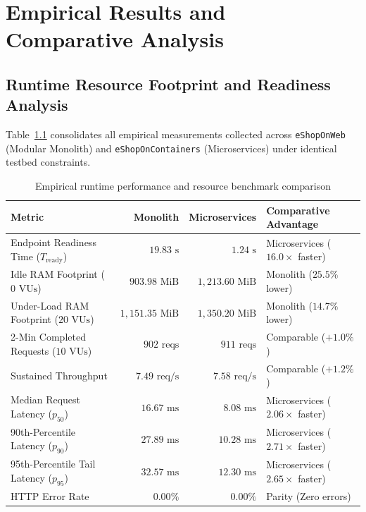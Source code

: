 \chapter{Empirical Results and Comparative Analysis}
\label{chap:results}

\section{Runtime Resource Footprint and Readiness Analysis}
\label{sec:resource-results}

Table~\ref{tab:runtime-metrics} consolidates all empirical measurements collected across \texttt{eShopOnWeb} (Modular Monolith) and \texttt{eShopOnContainers} (Microservices) under identical testbed constraints.

\begin{table}[h]
  \caption{Empirical runtime performance and resource benchmark comparison}
  \label{tab:runtime-metrics}
  \centering
  \begin{tabular}{p{5.0cm}rrp{3.6cm}}
    \toprule
    \textbf{Metric} & \textbf{Monolith} & \textbf{Microservices} & \textbf{Comparative Advantage} \\
    \midrule
    Endpoint Readiness Time ($T_{\text{ready}}$) & $19.83\text{ s}$ & $1.24\text{ s}$ & Microservices ($16.0\times$ faster) \\
    Idle RAM Footprint ($0\text{ VUs}$) & $903.98\text{ MiB}$ & $1,213.60\text{ MiB}$ & Monolith ($25.5\%$ lower) \\
    Under-Load RAM Footprint ($20\text{ VUs}$) & $1,151.35\text{ MiB}$ & $1,350.20\text{ MiB}$ & Monolith ($14.7\%$ lower) \\
    2-Min Completed Requests ($10\text{ VUs}$) & $902\text{ reqs}$ & $911\text{ reqs}$ & Comparable ($+1.0\%$) \\
    Sustained Throughput & $7.49\text{ req/s}$ & $7.58\text{ req/s}$ & Comparable ($+1.2\%$) \\
    Median Request Latency ($p_{50}$) & $16.67\text{ ms}$ & $8.08\text{ ms}$ & Microservices ($2.06\times$ faster) \\
    90th-Percentile Latency ($p_{90}$) & $27.89\text{ ms}$ & $10.28\text{ ms}$ & Microservices ($2.71\times$ faster) \\
    95th-Percentile Tail Latency ($p_{95}$) & $32.57\text{ ms}$ & $12.30\text{ ms}$ & Microservices ($2.65\times$ faster) \\
    HTTP Error Rate & $0.00\%$ & $0.00\%$ & Parity (Zero errors) \\
    \bottomrule
  \end{tabular}
\end{table}

